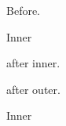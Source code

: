 \documentclass{article}
\begin{document}
Before.

\parbox{5cm}{\parbox{2cm}{Inner} after inner.} after outer.

\begin{minipage}[t]{5cm}
\parbox[t]{2cm}{Inner}
\end{minipage}
\end{document}
